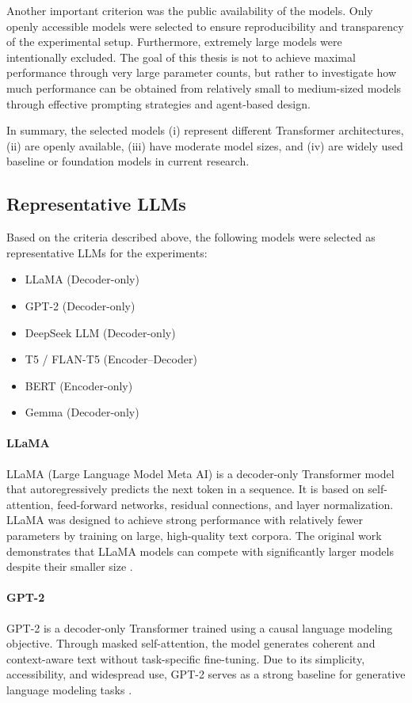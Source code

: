Another important criterion was the public availability of the models. Only openly accessible models were selected to ensure reproducibility and transparency of the experimental setup. Furthermore, extremely large models were intentionally excluded. The goal of this thesis is not to achieve maximal performance through very large parameter counts, but rather to investigate how much performance can be obtained from relatively small to medium-sized models through effective prompting strategies and agent-based design.

In summary, the selected models
(i) represent different Transformer architectures,
(ii) are openly available,
(iii) have moderate model sizes, and
(iv) are widely used baseline or foundation models in current research.

\subsection{Representative LLMs}

Based on the criteria described above, the following models were selected as representative LLMs for the experiments:

\begin{itemize}
    \item LLaMA (Decoder-only)
    \item GPT-2 (Decoder-only)
    \item DeepSeek LLM (Decoder-only)
    \item T5 / FLAN-T5 (Encoder--Decoder)
    \item BERT (Encoder-only)
    \item Gemma (Decoder-only)
\end{itemize}

\paragraph{LLaMA}
LLaMA (Large Language Model Meta AI) is a decoder-only Transformer model that autoregressively predicts the next token in a sequence. It is based on self-attention, feed-forward networks, residual connections, and layer normalization. LLaMA was designed to achieve strong performance with relatively fewer parameters by training on large, high-quality text corpora. The original work demonstrates that LLaMA models can compete with significantly larger models despite their smaller size \cite{touvron2023llamaopenefficientfoundation}.

\paragraph{GPT-2}
GPT-2 is a decoder-only Transformer trained using a causal language modeling objective. Through masked self-attention, the model generates coherent and context-aware text without task-specific fine-tuning. Due to its simplicity, accessibility, and widespread use, GPT-2 serves as a strong baseline for generative language modeling tasks \cite{yenduri2023generativepretrainedtransformercomprehensive}.

